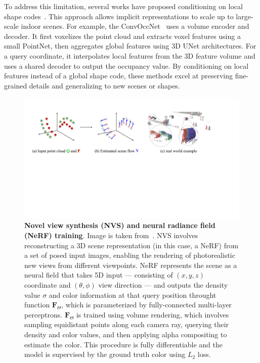 To address this limitation, several works have proposed conditioning on local shape codes~\cite{peng2020convolutional, jiang2020local, genova2020local, chabra2020deep}. This approach allows implicit representations to scale up to large-scale indoor scenes. For example, the ConvOccNet~\cite{peng2020convolutional} uses a volume encoder and decoder. It first voxelizes the point cloud and extracts voxel features using a small PointNet, then aggregates global features using 3D UNet architectures. For a query coordinate, it interpolates local features from the 3D feature volume and uses a shared decoder to output the occupancy value. By conditioning on local features instead of a global shape code, these methods excel at preserving fine-grained details and generalizing to new scenes or shapes.

\begin{figure}[t]
    \centering
    \includegraphics[width=1.0\columnwidth]{imgs/nerf.pdf}
    \caption{\textbf{Novel view synthesis (NVS) and neural radiance field (NeRF) training}. Image is taken from~\cite{mildenhall2020nerf}. NVS involves reconstructing a 3D scene representation (in this case, a NeRF) from a set of posed input images, enabling the rendering of photorealistic new views from different viewpoints. NeRF represents the scene as a neural field that takes 5D input — consisting of $(x, y, z)$ coordinate and $(\theta, \phi)$ view direction — and outputs the density value ${\sigma}$ and color information at that query position throught function $\mathbf{F}_{\Theta}$, which is parameterized by fully-connected multi-layer perceptrons. $\mathbf{F}_{\Theta}$ is trained using volume rendering, which involves sampling equidistant points along each camera ray, querying their density and color values, and then applying alpha compositing to estimate the color. This procedure is fully differentiable and the model is supervised by the ground truth color using $L_2$ loss.}
    \label{fig:nerf_illustration}
\end{figure}

